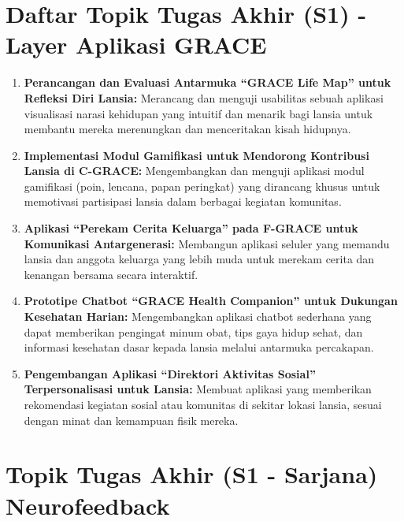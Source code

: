 \documentclass[
  letterpaper,
  DIV=11,
  numbers=noendperiod]{scrreprt}
\begin{document}
\section{\texorpdfstring{\textbf{Daftar Topik Tugas Akhir (S1) - Layer
Aplikasi
GRACE}}{Daftar Topik Tugas Akhir (S1) - Layer Aplikasi GRACE}}\label{daftar-topik-tugas-akhir-s1---layer-aplikasi-grace}

\begin{enumerate}
\def\labelenumi{\arabic{enumi}.}
\item
  \textbf{Perancangan dan Evaluasi Antarmuka ``GRACE Life Map'' untuk
  Refleksi Diri Lansia:} Merancang dan menguji usabilitas sebuah
  aplikasi visualisasi narasi kehidupan yang intuitif dan menarik bagi
  lansia untuk membantu mereka merenungkan dan menceritakan kisah
  hidupnya.
\item
  \textbf{Implementasi Modul Gamifikasi untuk Mendorong Kontribusi
  Lansia di C-GRACE:} Mengembangkan dan menguji aplikasi modul
  gamifikasi (poin, lencana, papan peringkat) yang dirancang khusus
  untuk memotivasi partisipasi lansia dalam berbagai kegiatan komunitas.
\item
  \textbf{Aplikasi ``Perekam Cerita Keluarga'' pada F-GRACE untuk
  Komunikasi Antargenerasi:} Membangun aplikasi seluler yang memandu
  lansia dan anggota keluarga yang lebih muda untuk merekam cerita dan
  kenangan bersama secara interaktif.
\item
  \textbf{Prototipe Chatbot ``GRACE Health Companion'' untuk Dukungan
  Kesehatan Harian:} Mengembangkan aplikasi chatbot sederhana yang dapat
  memberikan pengingat minum obat, tips gaya hidup sehat, dan informasi
  kesehatan dasar kepada lansia melalui antarmuka percakapan.
\item
  \textbf{Pengembangan Aplikasi ``Direktori Aktivitas Sosial''
  Terpersonalisasi untuk Lansia:} Membuat aplikasi yang memberikan
  rekomendasi kegiatan sosial atau komunitas di sekitar lokasi lansia,
  sesuai dengan minat dan kemampuan fisik mereka.
\end{enumerate}

\section{\texorpdfstring{\textbf{Topik Tugas Akhir (S1 - Sarjana)
Neurofeedback}}{Topik Tugas Akhir (S1 - Sarjana) Neurofeedback}}\label{topik-tugas-akhir-s1---sarjana-neurofeedback}
\end{document}
